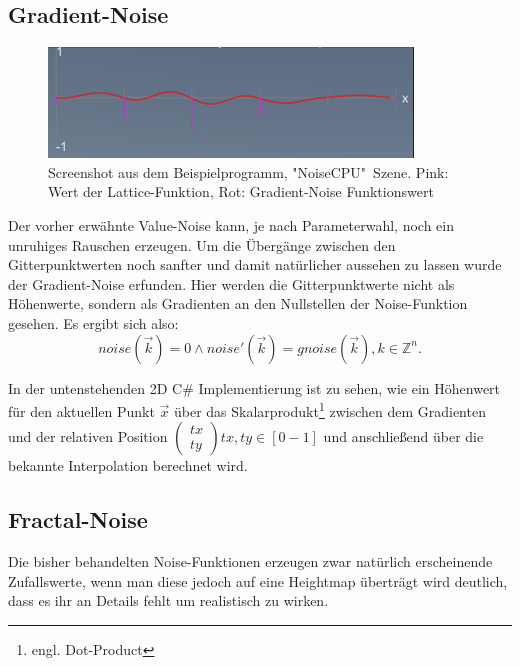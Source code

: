 \subsection{Gradient-Noise}\label{Gradient-Noise}
\begin{figure}[!ht]%
	\centering
	\includegraphics[width=\textwidth]{images/gnoise.png}
	\caption{Screenshot aus dem Beispielprogramm, "NoiseCPU"\ Szene. Pink: Wert der Lattice-Funktion, Rot: Gradient-Noise Funktionswert}\label{img.vnoise}
\end{figure}
Der vorher erwähnte Value-Noise kann, je nach Parameterwahl, noch ein unruhiges Rauschen erzeugen. Um die Übergänge zwischen den Gitterpunktwerten noch sanfter und damit natürlicher aussehen zu lassen wurde der Gradient-Noise erfunden.
Hier werden die Gitterpunktwerte nicht als Höhenwerte, sondern als Gradienten an den Nullstellen der Noise-Funktion gesehen.
Es ergibt sich also:
\begin{equation}
noise(\vec{k}) = 0 \land 
noise'(\vec{k}) = gnoise(\vec{k}),  k \in \mathbb{Z}^n  .
\end{equation}

In der untenstehenden 2D C\# Implementierung ist zu sehen, wie ein Höhenwert für den aktuellen Punkt  $\vec{x}$ über das Skalarprodukt\footnote{engl. Dot-Product} zwischen dem Gradienten und der relativen Position $\begin{pmatrix}tx\\ty\end{pmatrix}  tx, ty\in [0-1]$ und anschließend über die bekannte Interpolation berechnet wird.


 

\subsection{Fractal-Noise}\label{Fractal-Noise}

Die bisher behandelten Noise-Funktionen erzeugen zwar natürlich erscheinende Zufallswerte, wenn man diese jedoch auf eine Heightmap überträgt wird deutlich, dass es ihr an Details fehlt um realistisch zu wirken.

